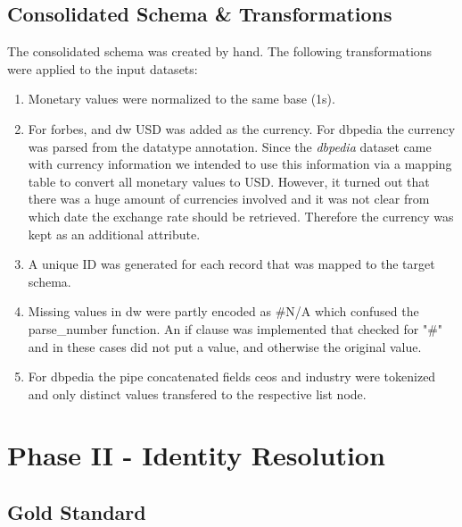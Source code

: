 \documentclass[11pt,titlepage,oneside,openany]{book}
\begin{document}
\section{Consolidated Schema \& Transformations}

The consolidated schema was created by hand. The following transformations were applied to the input datasets:\begin{enumerate}
	\item Monetary values were normalized to the same base (1s).
	\item For forbes, and dw USD was added as the currency. For dbpedia the currency was parsed from the datatype annotation. Since the \textit{dbpedia} dataset came with currency information we intended to use this information via a mapping table to convert all monetary values to USD. However, it turned out that there was a huge amount of currencies involved and it was not clear from which date the exchange rate should be retrieved. Therefore the currency was kept as an additional attribute.
	\item A unique ID was generated for each record that was mapped to the target schema.
	\item Missing values in dw were partly encoded as \#N/A which confused the parse\_number function. An if clause was implemented that checked for "\#" and in these cases did not put a value, and otherwise the original value.
	\item For dbpedia the pipe concatenated fields ceos and industry were tokenized and only distinct values transfered to the respective list node.
\end{enumerate} 



\chapter{Phase II - Identity Resolution}
\label{cha:identity-resolution}

\section{Gold Standard}
\label{sec:gold-standard-IR}
\end{document}
